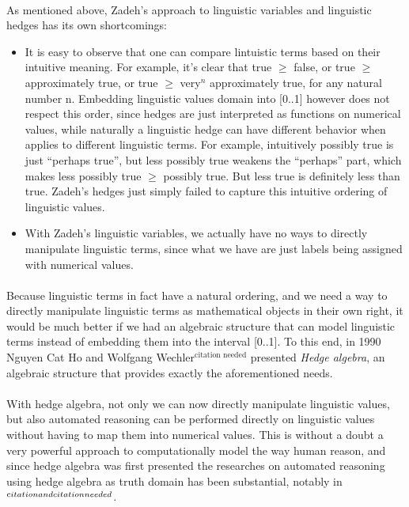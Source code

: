 \documentclass[../gr-final.tex]{subfiles}
\begin{document}
\paragraph{} As mentioned above, Zadeh's approach to linguistic
variables and linguistic hedges has its own shortcomings:
\begin{itemize}
        \item It is easy to observe that one can compare
                lintuistic terms based on their intuitive meaning. For
                example, it's clear that true $\ge$ false, or
                true $\ge$ approximately true, or true $\ge$
                very$^n$ approximately true, for any natural
                number n. Embedding linguistic values domain into
                [0..1] however does not respect this order, since
                hedges are just interpreted as functions on
                numerical values, while naturally a linguistic
                hedge can have different behavior when applies to
                different linguistic terms. For example, intuitively
                possibly true is just ``perhaps true'', but less
                possibly true weakens the ``perhaps'' part, which
                makes less possibly true $\ge$ possibly true. But
                less true is definitely less than true. Zadeh's
                hedges just simply failed to capture this
                intuitive ordering of linguistic values.
        \item With Zadeh's linguistic variables, we actually have
                no ways to directly manipulate linguistic terms,
                since what we have are just labels being assigned
                with numerical values.                                 
\end{itemize}
\paragraph{} Because linguistic terms in fact have a natural ordering, and we
need a way to directly manipulate linguistic terms as
mathematical objects in their own right, it would be much better
if we had an algebraic structure that can model linguistic terms
instead of embedding them into the interval [0..1]. To this end,
in 1990 Nguyen Cat Ho and Wolfgang Wechler$^{\text{citation
needed}}$ presented {\em Hedge algebra}, an algebraic structure
that provides exactly the aforementioned needs.
\paragraph{} With hedge algebra, not only we can now directly manipulate
linguistic values, but also automated reasoning can be performed
directly on linguistic values without having to map them into
numerical values. This is without a doubt a very powerful approach 
to computationally model the way human reason, and since hedge
algebra was first presented the researches on automated reasoning
using hedge algebra as truth domain has been substantial, notably
in$^{{\text citation and citation needed}}$.
\end{document}
